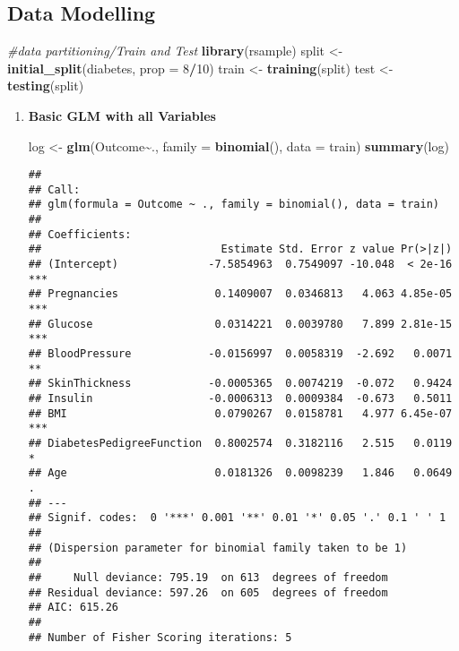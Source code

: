 \documentclass[
]{article}
\newenvironment{Shaded}{\begin{snugshade}}{\end{snugshade}}
\newcommand{\AttributeTok}[1]{\textcolor[rgb]{0.13,0.29,0.53}{#1}}
\newcommand{\CommentTok}[1]{\textcolor[rgb]{0.56,0.35,0.01}{\textit{#1}}}
\newcommand{\DecValTok}[1]{\textcolor[rgb]{0.00,0.00,0.81}{#1}}
\newcommand{\FunctionTok}[1]{\textcolor[rgb]{0.13,0.29,0.53}{\textbf{#1}}}
\newcommand{\NormalTok}[1]{#1}
\newcommand{\OtherTok}[1]{\textcolor[rgb]{0.56,0.35,0.01}{#1}}
\newcommand{\SpecialCharTok}[1]{\textcolor[rgb]{0.81,0.36,0.00}{\textbf{#1}}}
\begin{document}
\hypertarget{data-modelling}{%
\subsection{Data Modelling}\label{data-modelling}}

\begin{Shaded}
\begin{Highlighting}[]
\CommentTok{\#data partitioning/Train and Test}
\FunctionTok{library}\NormalTok{(rsample)}
\NormalTok{split }\OtherTok{\textless{}{-}} \FunctionTok{initial\_split}\NormalTok{(diabetes, }\AttributeTok{prop =} \DecValTok{8}\SpecialCharTok{/}\DecValTok{10}\NormalTok{)}
\NormalTok{train }\OtherTok{\textless{}{-}} \FunctionTok{training}\NormalTok{(split)}
\NormalTok{test }\OtherTok{\textless{}{-}} \FunctionTok{testing}\NormalTok{(split)}
\end{Highlighting}
\end{Shaded}

\begin{enumerate}
\def\labelenumi{\arabic{enumi}.}
\item
  \textbf{Basic GLM with all Variables}

\begin{Shaded}
\begin{Highlighting}[]
\NormalTok{log }\OtherTok{\textless{}{-}} \FunctionTok{glm}\NormalTok{(Outcome}\SpecialCharTok{\textasciitilde{}}\NormalTok{., }\AttributeTok{family =} \FunctionTok{binomial}\NormalTok{(), }\AttributeTok{data =}\NormalTok{ train)}
\FunctionTok{summary}\NormalTok{(log)}
\end{Highlighting}
\end{Shaded}

\begin{verbatim}
## 
## Call:
## glm(formula = Outcome ~ ., family = binomial(), data = train)
## 
## Coefficients:
##                            Estimate Std. Error z value Pr(>|z|)    
## (Intercept)              -7.5854963  0.7549097 -10.048  < 2e-16 ***
## Pregnancies               0.1409007  0.0346813   4.063 4.85e-05 ***
## Glucose                   0.0314221  0.0039780   7.899 2.81e-15 ***
## BloodPressure            -0.0156997  0.0058319  -2.692   0.0071 ** 
## SkinThickness            -0.0005365  0.0074219  -0.072   0.9424    
## Insulin                  -0.0006313  0.0009384  -0.673   0.5011    
## BMI                       0.0790267  0.0158781   4.977 6.45e-07 ***
## DiabetesPedigreeFunction  0.8002574  0.3182116   2.515   0.0119 *  
## Age                       0.0181326  0.0098239   1.846   0.0649 .  
## ---
## Signif. codes:  0 '***' 0.001 '**' 0.01 '*' 0.05 '.' 0.1 ' ' 1
## 
## (Dispersion parameter for binomial family taken to be 1)
## 
##     Null deviance: 795.19  on 613  degrees of freedom
## Residual deviance: 597.26  on 605  degrees of freedom
## AIC: 615.26
## 
## Number of Fisher Scoring iterations: 5
\end{verbatim}
\end{enumerate}
\end{document}
